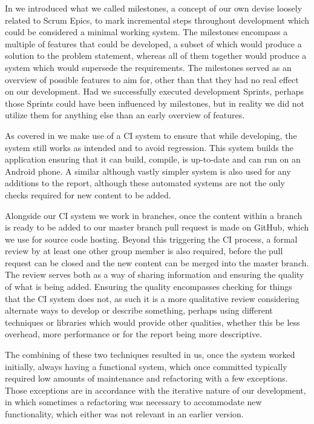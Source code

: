 In  we introduced what we called milestones, a concept of our own devise loosely related to Scrum Epics, to mark incremental steps throughout development which could be considered a minimal working system.
The milestones encompass a multiple of features that could be developed, a subset of which would produce a solution to the problem statement, whereas all of them together would produce a system which would supersede the requirements.
The milestones served as an overview of possible features to aim for, other than that they had no real effect on our development.
Had we successfully executed development Sprints, perhaps those Sprints could have been influenced by milestones, but in reality we did not utilize them for anything else than an early overview of features.

\bigskip
As covered in  we make use of a \ac{CI} system to ensure that while developing, the system still works as intended and to avoid regression.
This system builds the application ensuring that it can build, compile, is up-to-date and can run on an Android phone.
A similar although vastly simpler system is also used for any additions to the report, although these automated systems are not the only checks required for new content to be added.

Alongside our \ac{CI} system we work in branches, once the content within a branch is ready to be added to our master branch pull request is made on GitHub, which we use for source code hosting.
Beyond this triggering the \ac{CI} process, a formal review by at least one other group member is also required, before the pull request can be closed and the new content can be merged into the master branch.
The review serves both as a way of sharing information and ensuring the quality of what is being added.
Ensuring the quality encompasses checking for things that the \ac{CI} system does not, as such it is a more qualitative review considering alternate ways to develop or describe something, perhaps using different techniques or libraries which would provide other qualities, whether this be less overhead, more performance or for the report being more descriptive.

The combining of these two techniques resulted in us, once the system worked initially, always having a functional system, which once committed typically required low amounts of maintenance and refactoring with a few exceptions.
Those exceptions are in accordance with the iterative nature of our development, in which sometimes a refactoring was necessary to accommodate new functionality, which either was not relevant in an earlier version.

